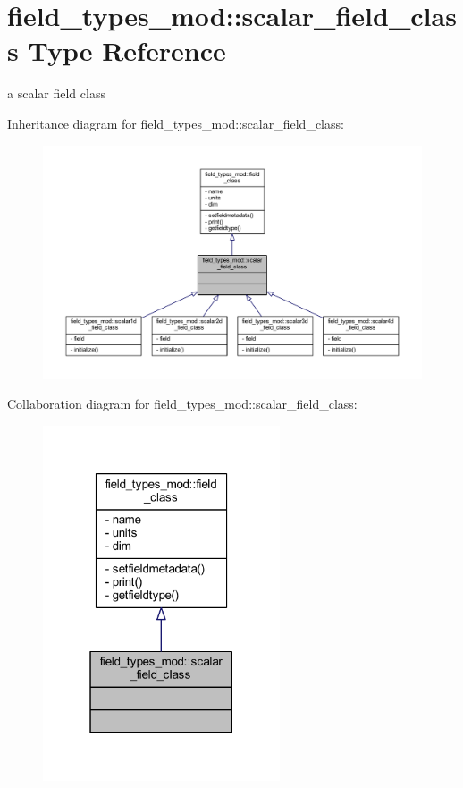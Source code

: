 \hypertarget{structfield__types__mod_1_1scalar__field__class}{}\section{field\+\_\+types\+\_\+mod\+:\+:scalar\+\_\+field\+\_\+class Type Reference}
\label{structfield__types__mod_1_1scalar__field__class}


a scalar field class  




Inheritance diagram for field\+\_\+types\+\_\+mod\+:\+:scalar\+\_\+field\+\_\+class\+:\nopagebreak
\begin{figure}[H]
\begin{center}
\leavevmode
\includegraphics[width=350pt]{structfield__types__mod_1_1scalar__field__class__inherit__graph}
\end{center}
\end{figure}


Collaboration diagram for field\+\_\+types\+\_\+mod\+:\+:scalar\+\_\+field\+\_\+class\+:\nopagebreak
\begin{figure}[H]
\begin{center}
\leavevmode
\includegraphics[width=199pt]{structfield__types__mod_1_1scalar__field__class__coll__graph}
\end{center}
\end{figure}


